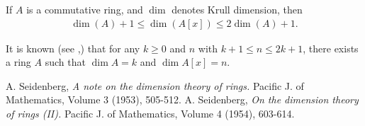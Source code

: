 \documentclass[12pt]{article}
\newcommand{\<}{\langle}
\renewcommand{\>}{\rangle}
\begin{document}
If $A$ is a commutative ring, and $\operatorname{dim}$ denotes Krull dimension, then
\begin{align*}
\operatorname{dim}(A)+1\leq \operatorname{dim}(A[x])\leq 2\operatorname{dim}(A)+1.
\end{align*}

It is known (see \cite{Seid},\cite{Seid2}) that for any $k\geq 0$ and $n$ with $k+1\leq n\leq 2k+1$, there exists a ring $A$ such that $\dim A=k$ and $\dim A[x]=n$.

\begin{thebibliography}{9}
 A. Seidenberg, \emph{A note on the dimension theory of rings.} Pacific J. of Mathematics, Volume 3 (1953), 505-512.
 A. Seidenberg, \emph{On the dimension theory of rings (II).} Pacific J. of Mathematics, Volume 4 (1954), 603-614.

\end{thebibliography}
\end{document}
